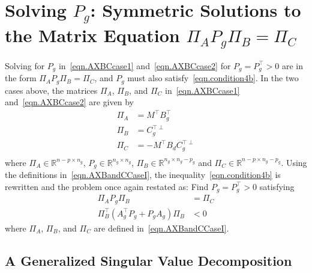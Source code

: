 \section{Solving $P_{g}$: Symmetric Solutions to the Matrix Equation $\Pi_{A}P_{g}\Pi_{B}=\Pi_{C}$}

Solving for $P_{g}$ in\ \eqref{eqn.AXBCcase1} and\ \eqref{eqn.AXBCcase2} for $P_{g}=P_{g}^{\top}>0$ are in the form $\Pi_{A}P_{g}\Pi_{B}=\Pi_{C}$, and $P_{g}$ must also satisfy\ \eqref{eqn.condition4b}.
In the two cases above, the matrices $\Pi_{A}$, $\Pi_{B}$, and $\Pi_{C}$ in\ \eqref{eqn.AXBCcase1} and\ \eqref{eqn.AXBCcase2} are given by
\begin{equation}
  \label{eqn.AXBandCCaseI}
  \begin{split}
    \Pi_{A} &= M^{\top}B_{g}^{\top} \\
    \Pi_{B} &= C_{g}^{\top\perp} \\
    \Pi_{C} &= -M^{\top}B_{d}C_{g}^{\top\perp} \\
  \end{split}
\end{equation}
where $\Pi_{A}\in\mathbb{R}^{n-p\times n_{g}}$, $P_{g}\in\mathbb{R}^{n_{g}\times n_{g}}$, $\Pi_{B}\in\mathbb{R}^{n_{g}\times n_{g}-p_{g}}$ and $\Pi_{C}\in\mathbb{R}^{n-p\times n_{g}-p_{g}}$.
Using the definitions in\ \eqref{eqn.AXBandCCaseI}, the inequality\ \eqref{eqn.condition4b} is rewritten and the problem once again restated as: Find $P_{g}=P_{g}^{\top}>0$ satisfying
\begin{align}
  \label{eqn.PiAPgPiBPiC}
  \Pi_{A}P_{g}\Pi_{B} &= \Pi_{C} \\
  \label{eqn.condition4bCaseI}
  \Pi_{B}^{\top} (A_{g}^{\top}P_{g} + P_{g}A_{g}) \Pi_{B} &< 0
\end{align}
where $\Pi_{A}$, $\Pi_{B}$, and $\Pi_{C}$ are defined in\ \eqref{eqn.AXBandCCaseI}.

\subsection{A Generalized Singular Value Decomposition}


